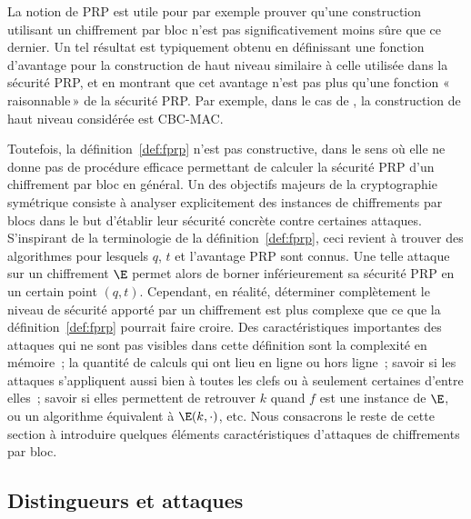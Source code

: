 \medskip


La notion de PRP est utile pour par exemple prouver qu'une construction utilisant un chiffrement par bloc n'est pas significativement moins
sûre que ce dernier. Un tel résultat est typiquement obtenu en définissant une fonction d'avantage pour la construction de haut niveau
similaire à celle utilisée dans la sécurité PRP, et en montrant
que cet avantage n'est pas plus qu'une fonction «\,raisonnable\,» de la sécurité PRP.
Par exemple, dans le cas de \cite{DBLP:journals/jcss/BellareKR00}, la construction de haut niveau considérée est CBC-MAC.

Toutefois, la définition~\ref{def:fprp} n'est pas constructive, dans le sens où elle ne donne pas de procédure efficace permettant de calculer la sécurité PRP
d'un chiffrement par bloc en général.
Un des objectifs majeurs de la cryptographie symétrique consiste à analyser explicitement des instances de chiffrements par blocs dans le but d'établir leur sécurité
concrète contre certaines attaques. S'inspirant de la terminologie de la définition~\ref{def:fprp}, ceci revient à trouver
des algorithmes pour lesquels $q$, $t$ et l'avantage PRP sont connus. Une telle attaque sur un chiffrement $\E$ permet alors de borner inférieurement sa sécurité PRP
en un certain point $(q,t)$.
Cependant, en réalité, déterminer complètement le niveau de sécurité apporté par un chiffrement est plus complexe que ce que la définition~\ref{def:fprp} pourrait faire croire.
Des caractéristiques importantes des attaques qui ne sont pas visibles dans cette définition
sont la complexité en mémoire~; la quantité de calculs qui ont lieu en ligne ou hors ligne~; savoir si les attaques s'appliquent
aussi bien à toutes les clefs ou à seulement certaines d'entre elles~; savoir si elles permettent de retrouver $k$ quand $f$ est une instance de $\E$, ou un algorithme
équivalent à $\E(k,\cdot)$, etc.
Nous consacrons le reste de cette section à introduire quelques éléments caractéristiques d'attaques de chiffrements par bloc.

\subsection{Distingueurs et attaques}

